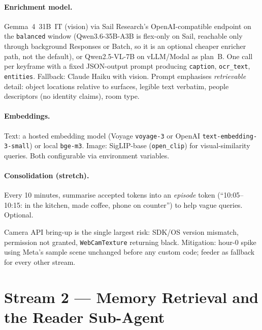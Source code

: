 \documentclass[11pt,a4paper]{article}
\begin{document}
\paragraph{Enrichment model.} Gemma~4~31B~IT (vision) via Sail Research's OpenAI-compatible endpoint on the \texttt{balanced} window (Qwen3.6-35B-A3B is flex-only on Sail, reachable only through background Responses or Batch, so it is an optional cheaper enricher path, not the default), or Qwen2.5-VL-7B on vLLM/Modal as plan~B. One call per keyframe with a fixed JSON-output prompt producing \texttt{caption}, \texttt{ocr\_text}, \texttt{entities}. Fallback: Claude Haiku with vision. Prompt emphasises \emph{retrievable} detail: object locations relative to surfaces, legible text verbatim, people descriptors (no identity claims), room type.

\paragraph{Embeddings.} Text: a hosted embedding model (Voyage \texttt{voyage-3} or OpenAI \texttt{text-embedding-3-small}) or local \texttt{bge-m3}. Image: SigLIP-base (\texttt{open\_clip}) for visual-similarity queries. Both configurable via environment variables.

\paragraph{Consolidation (stretch).} Every 10 minutes, summarise accepted tokens into an \emph{episode} token (``10:05--10:15: in the kitchen, made coffee, phone on counter'') to help vague queries. Optional.

\begin{risk}
Camera API bring-up is the single largest risk: SDK/OS version mismatch, permission not granted, \texttt{WebCamTexture} returning black. Mitigation: hour-0 spike using Meta's sample scene unchanged before any custom code; feeder as fallback for every other stream.
\end{risk}

\section{Stream 2 --- Memory Retrieval and the Reader Sub-Agent}
\end{document}
